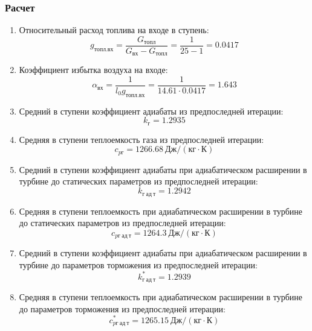 \documentclass[a4paper,10pt]{article}
\begin{document}
    \subsubsection{Расчет}

    
    \begin{enumerate}

        \item Относительный расход топлива на входе в ступень:
        \[
            g_{топл.вх} = \frac{ G_{топл} }{ G_{вх} - G_{топл} } =
                \frac{ 1 }{ 25 - 1 } =
            0.0417
        \]

        \item Коэффициент избытка воздуха на входе:
        \[
            \alpha_{вх} = \frac{ 1 }{ l_0 g_{топл.вх} } =
                \frac{ 1 }{ 14.61 \cdot 0.0417 } =
            1.643
        \]

        \item Средний в ступени коэффициент адиабаты из предпоследней итерации:
        \[
            k_г = 1.2935
        \]

        \item Средняя в ступени теплоемкость газа из предпоследней итерации:
        \[
            c_{pг} = 1266.68 \ Дж/(кг \cdot К)
        \]

        \item Средний в ступени коэффициент адиабаты при адиабатическом расширении в турбине до статических параметров из предпоследней итерации:
        \[
            k_{г\ ад\ т} = 1.2942
        \]

        \item Средняя в ступени теплоемкость при адиабатическом расширении в турбине до статических параметров из предпоследней итерации:
        \[
            c_{pг\ ад\ т} = 1264.3 \ Дж/(кг \cdot К)
        \]

        \item Средний в ступени коэффициент адиабаты при адиабатическом расширении в турбине до параметров торможения из предпоследней итерации:
        \[
            k_{г\ ад\ т}^* = 1.2939
        \]

        \item Средняя в ступени теплоемкость при адиабатическом расширении в турбине до параметров торможения из предпоследней итерации:
        \[
            c_{pг\ ад\ т}^* = 1265.15 \ Дж/(кг \cdot К)
        \]

        
        


\end{enumerate}
\end{document}
